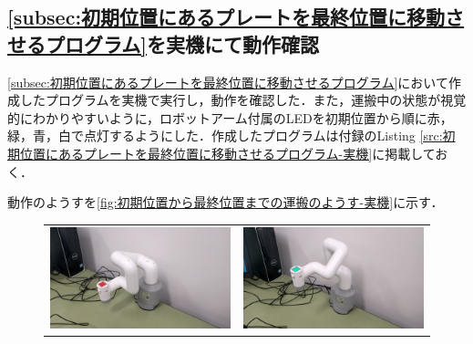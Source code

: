 \documentclass{ltjsarticle}
\begin{document}
\subsection{\cref{subsec:初期位置にあるプレートを最終位置に移動させるプログラム}を実機にて動作確認}
\cref{subsec:初期位置にあるプレートを最終位置に移動させるプログラム}において作成したプログラムを実機で実行し，動作を確認した．また，運搬中の状態が視覚的にわかりやすいように，ロボットアーム付属のLEDを初期位置から順に赤，緑，青，白で点灯するようにした．作成したプログラムは付録のListing \ref{src:初期位置にあるプレートを最終位置に移動させるプログラム-実機}に掲載しておく．

動作のようすを\cref{fig:初期位置から最終位置までの運搬のようす-実機}に示す．
\begin{figure}[H]
	\centering
	\begin{tabular}{cc}
		\begin{minipage}[c]{0.48\linewidth}
			\centering
			\includegraphics[width = 0.96\linewidth]{../results/program10_1.jpg}
			\subcaption{初期位置$\mqty[150 & -100 & 50 & 1]^\mathsf{T}$}
		\end{minipage}
		&
		\begin{minipage}[c]{0.48\linewidth}
			\centering
			\includegraphics[width = 0.96\linewidth]{../results/program10_2.jpg}

\end{minipage}
\end{tabular}
\end{figure}
\end{document}
